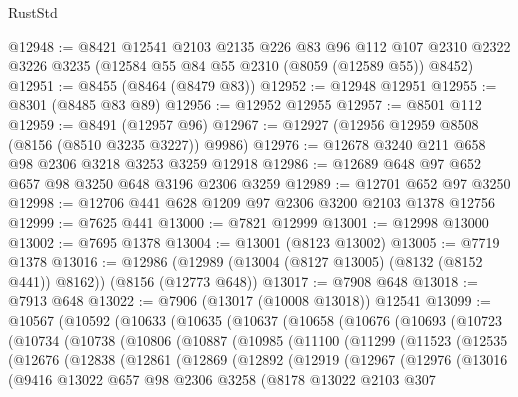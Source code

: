 \begin{lexlean}{RustStd}
\begin{coremodule}
{\begin{coremodule}
{{{{{{{{{{{{{{{{{{{{{{{{{{{{{{{{{{@12948 := @8421
    @12541
    @2103
    @2135
    @226
    @83
    @96
    @112
    @107
    @2310
    @2322
    @3226
    @3235
    (@12584 @55 @84 @55 @2310 (@8059 (@12589 @55)) @8452)
@12951 := @8455 (@8464 (@8479 @83))
@12952 := @12948 @12951
@12955 := @8301 (@8485 @83 @89)
@12956 := @12952 @12955
@12957 := @8501 @112
@12959 := @8491 (@12957 @96)
@12967 := @12927 (@12956 @12959 @8508 (@8156 (@8510 @3235 @3227)) @9986)
@12976 := @12678 @3240 @211 @658 @98 @2306 @3218 @3253 @3259 @12918
@12986 := @12689 @648 @97 @652 @657 @98 @3250 @648 @3196 @2306 @3259
@12989 := @12701 @652 @97 @3250
@12998 := @12706 @441 @628 @1209 @97 @2306 @3200 @2103 @1378 @12756
@12999 := @7625 @441
@13000 := @7821 @12999
@13001 := @12998 @13000
@13002 := @7695 @1378
@13004 := @13001 (@8123 @13002)
@13005 := @7719 @1378
@13016 := @12986 (@12989 (@13004 (@8127 @13005) (@8132 (@8152 @441)) @8162)) (@8156 (@12773 @648))
@13017 := @7908 @648
@13018 := @7913 @648
@13022 := @7906 (@13017 (@10008 @13018)) @12541
@13099 := @10567
    (@10592
      (@10633
        (@10635
          (@10637
            (@10658
              (@10676
                (@10693
                  (@10723
                    (@10734
                      (@10738
                        (@10806
                          (@10887
                            (@10985
                              (@11100
                                (@11299
                                  (@11523
                                    (@12535
                                      (@12676
                                        (@12838
                                          (@12861
                                            (@12869
                                              (@12892
                                                (@12919
                                                  (@12967
                                                    (@12976
                                                      (@13016
                                                        (@9416
                                                          @13022
                                                          @657
                                                          @98
                                                          @2306
                                                          @3258
                                                          (@8178
                                                            @13022
                                                            @2103
                                                            @307
}}}}}}}}}}}}}}}}}}}}}}}}}}}}}}}}}}
\end{coremodule}}
\end{coremodule}
\end{lexlean}
